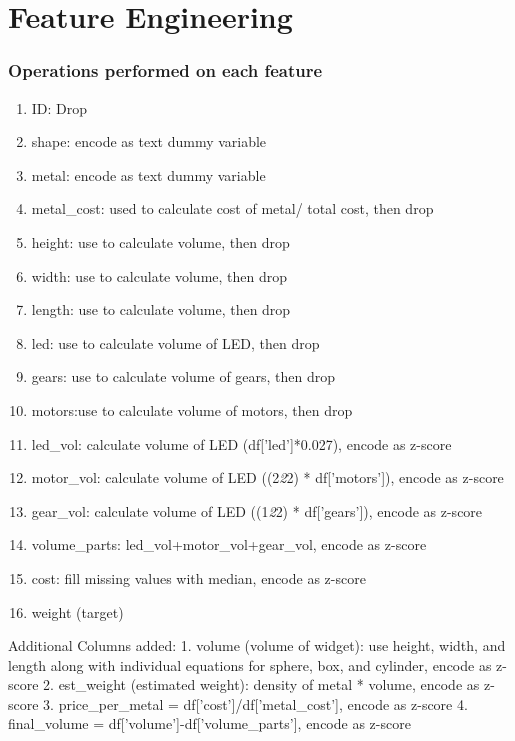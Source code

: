 \documentclass[11pt]{article}
\providecommand{\tightlist}{%
      \setlength{\itemsep}{0pt}\setlength{\parskip}{0pt}}
\begin{document}
    \section{Feature Engineering}\label{feature-engineering}

\subsubsection{Operations performed on each
feature}\label{operations-performed-on-each-feature}

\begin{enumerate}
\def\labelenumi{\arabic{enumi}.}
\tightlist
\item
  ID: Drop
\item
  shape: encode as text dummy variable
\item
  metal: encode as text dummy variable
\item
  metal\_cost: used to calculate cost of metal/ total cost, then drop
\item
  height: use to calculate volume, then drop
\item
  width: use to calculate volume, then drop
\item
  length: use to calculate volume, then drop
\item
  led: use to calculate volume of LED, then drop
\item
  gears: use to calculate volume of gears, then drop
\item
  motors:use to calculate volume of motors, then drop
\item
  led\_vol: calculate volume of LED (df{[}'led'{]}*0.027), encode as
  z-score
\item
  motor\_vol: calculate volume of LED ((2\emph{2}2) * df{[}'motors'{]}),
  encode as z-score
\item
  gear\_vol: calculate volume of LED ((1\emph{2}2) * df{[}'gears'{]}),
  encode as z-score
\item
  volume\_parts: led\_vol+motor\_vol+gear\_vol, encode as z-score
\item
  cost: fill missing values with median, encode as z-score
\item
  weight (target)
\end{enumerate}

Additional Columns added: 1. volume (volume of widget): use height,
width, and length along with individual equations for sphere, box, and
cylinder, encode as z-score 2. est\_weight (estimated weight): density
of metal * volume, encode as z-score 3. price\_per\_metal =
df{[}'cost'{]}/df{[}'metal\_cost'{]}, encode as z-score 4. final\_volume
= df{[}'volume'{]}-df{[}'volume\_parts'{]}, encode as z-score
\end{document}
